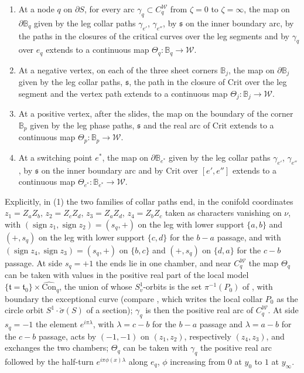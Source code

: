 \begin{lemma}\label{lem:collar}
\begin{enumerate}
\item[(1)] At a node $q$ on $\partial S$, for every arc $\gamma_q\subset C^{\mathscr W}_q$ from $\zeta=0$ to $\zeta=\infty$, the map on
$\partial\mathbb B_q$ given by the leg collar paths $\gamma_{e'}$, $\gamma_{e''}$, by $\mathfrak s$ on the inner boundary arc, by
the paths in the closures of the critical curves over the leg segments and by $\gamma_q$ over $e_q$ extends to a continuous map $\Theta_q\colon\mathbb B_q\to \mathscr W$.
\item[(2)] At a negative vertex, on each of the three sheet corners $\mathbb B_j$, the map on $\partial\mathbb B_j$ given by the
leg collar paths, $\mathfrak s$, the path in the closure of $\mathrm{Crit}$ over the leg segment and the vertex path extends to a continuous map $\Theta_j\colon\mathbb B_j\to \mathscr W$.
\item[(3)] At a positive vertex, after the slides, the map on the boundary of the corner $\mathbb B_p$ given by the leg phase
paths, $\mathfrak s$ and the real arc of $\mathrm{Crit}$ extends to a continuous map $\Theta_p\colon\mathbb B_p\to \mathscr W$.
\item[(4)] At a switching point $e^*$, the map on $\partial\mathbb B_{e^*}$ given by the leg collar paths $\gamma_{e'}$,
$\gamma_{e''}$, by $\mathfrak s$ on the inner boundary arc and by $\mathrm{Crit}$ over $[e',e'']$ extends to a continuous map
$\Theta_{e^*}\colon\mathbb B_{e^*}\to \mathscr W$.
\end{enumerate}
Explicitly, in (1) the two families of collar paths end, in the conifold coordinates $z_1=Z_aZ_b$, $z_2=Z_cZ_d$, $z_3=Z_aZ_d$,
$z_4=Z_bZ_c$ taken as characters vanishing on $\nu$, with $(\operatorname{sign}z_1,\operatorname{sign}z_2)=(s_q,+)$ on
the leg with lower support $\{a,b\}$ and $(+,s_q)$ on the leg with lower support $\{c,d\}$ for the $b-a$ passage, and
with $(\operatorname{sign}z_4,\operatorname{sign}z_3)=(s_q,+)$ on $\{b,c\}$ and $(+,s_q)$ on $\{d,a\}$ for the
$c-b$ passage. At side $s_q=+1$ the ends lie in one chamber, and near $C^{\mathscr W}_q$ the map $\Theta_q$ can be taken with
values in the positive real part of the local model $\{\mathfrak t=\mathfrak t_0\}\times\widehat{\mathrm{Con}}_q$, the union of
whose $S^1_v$-orbits is the set $\pi^{-1}(P_0)$ of \cite[Lemma~4.2]{CBM}, with boundary the exceptional curve (compare
\cite[Lemma~5.7]{CBM}, which writes the local collar $P_0$ as the circle orbit $S^1\cdot\check\sigma(S)$ of a section); $\gamma_q$ is then
the positive real arc of $C^{\mathscr W}_q$. At side $s_q=-1$ the element $e^{i\pi\lambda}$, with $\lambda=c-b$ for the $b-a$
passage and $\lambda=a-b$ for the $c-b$ passage, acts by $(-1,-1)$ on $(z_1,z_2)$, respectively $(z_4,z_3)$, and exchanges the
two chambers; $\Theta_q$ can be taken with $\gamma_q$ the positive real arc followed by the half-turn $e^{i\pi\phi(x)\lambda}$
along $e_q$, $\phi$ increasing from $0$ at $y_0$ to $1$ at $y_\infty$.


\end{lemma}
